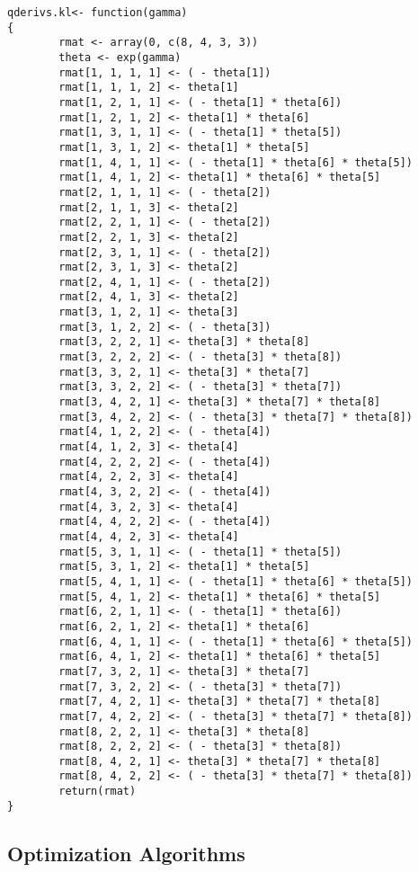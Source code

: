 \documentclass[12pt]{article}
\begin{document}
\begin{verbatim}
qderivs.kl<- function(gamma)
{
        rmat <- array(0, c(8, 4, 3, 3))
        theta <- exp(gamma)
        rmat[1, 1, 1, 1] <- ( - theta[1])
        rmat[1, 1, 1, 2] <- theta[1]
        rmat[1, 2, 1, 1] <- ( - theta[1] * theta[6])
        rmat[1, 2, 1, 2] <- theta[1] * theta[6]
        rmat[1, 3, 1, 1] <- ( - theta[1] * theta[5])
        rmat[1, 3, 1, 2] <- theta[1] * theta[5]
        rmat[1, 4, 1, 1] <- ( - theta[1] * theta[6] * theta[5])
        rmat[1, 4, 1, 2] <- theta[1] * theta[6] * theta[5]
        rmat[2, 1, 1, 1] <- ( - theta[2])
        rmat[2, 1, 1, 3] <- theta[2]
        rmat[2, 2, 1, 1] <- ( - theta[2])
        rmat[2, 2, 1, 3] <- theta[2]
        rmat[2, 3, 1, 1] <- ( - theta[2])
        rmat[2, 3, 1, 3] <- theta[2]
        rmat[2, 4, 1, 1] <- ( - theta[2])
        rmat[2, 4, 1, 3] <- theta[2]
        rmat[3, 1, 2, 1] <- theta[3]
        rmat[3, 1, 2, 2] <- ( - theta[3])
        rmat[3, 2, 2, 1] <- theta[3] * theta[8]
        rmat[3, 2, 2, 2] <- ( - theta[3] * theta[8])
        rmat[3, 3, 2, 1] <- theta[3] * theta[7]
        rmat[3, 3, 2, 2] <- ( - theta[3] * theta[7])
        rmat[3, 4, 2, 1] <- theta[3] * theta[7] * theta[8]
        rmat[3, 4, 2, 2] <- ( - theta[3] * theta[7] * theta[8])
        rmat[4, 1, 2, 2] <- ( - theta[4])
        rmat[4, 1, 2, 3] <- theta[4]
        rmat[4, 2, 2, 2] <- ( - theta[4])
        rmat[4, 2, 2, 3] <- theta[4]
        rmat[4, 3, 2, 2] <- ( - theta[4])
        rmat[4, 3, 2, 3] <- theta[4]
        rmat[4, 4, 2, 2] <- ( - theta[4])
        rmat[4, 4, 2, 3] <- theta[4]
        rmat[5, 3, 1, 1] <- ( - theta[1] * theta[5])
        rmat[5, 3, 1, 2] <- theta[1] * theta[5]
        rmat[5, 4, 1, 1] <- ( - theta[1] * theta[6] * theta[5])
        rmat[5, 4, 1, 2] <- theta[1] * theta[6] * theta[5]
        rmat[6, 2, 1, 1] <- ( - theta[1] * theta[6])
        rmat[6, 2, 1, 2] <- theta[1] * theta[6]
        rmat[6, 4, 1, 1] <- ( - theta[1] * theta[6] * theta[5])
        rmat[6, 4, 1, 2] <- theta[1] * theta[6] * theta[5]
        rmat[7, 3, 2, 1] <- theta[3] * theta[7]
        rmat[7, 3, 2, 2] <- ( - theta[3] * theta[7])
        rmat[7, 4, 2, 1] <- theta[3] * theta[7] * theta[8]
        rmat[7, 4, 2, 2] <- ( - theta[3] * theta[7] * theta[8])
        rmat[8, 2, 2, 1] <- theta[3] * theta[8]
        rmat[8, 2, 2, 2] <- ( - theta[3] * theta[8])
        rmat[8, 4, 2, 1] <- theta[3] * theta[7] * theta[8]
        rmat[8, 4, 2, 2] <- ( - theta[3] * theta[7] * theta[8])
        return(rmat)
}
\end{verbatim}

\subsection{Optimization Algorithms}
\end{document}
